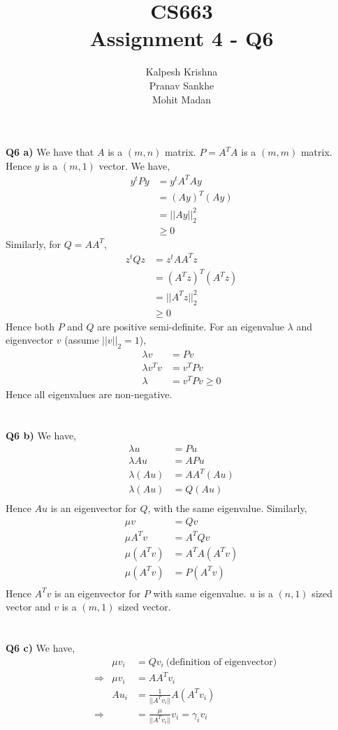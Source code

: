 \documentclass[11pt]{article}
\title{\textbf{CS663 \\ Assignment 4 - Q6}}
\author{Kalpesh Krishna\\ Pranav Sankhe \\ Mohit Madan}
\date{}
\begin{document}
\maketitle
\textbf{Q6 a)} We have that $A$ is a $(m, n)$ matrix. $P = A^T A$ is a $(m, m)$ matrix. Hence $y$ is a $(m, 1)$ vector. We have,
\begin{align*}
y^tPy &= y^t A^T A y\\
&= (Ay)^T (Ay) \\
&= ||Ay||_2^{2} \\
&\geq 0
\end{align*}
Similarly, for $Q = AA^T$,
\begin{align*}
z^tQz &= z^t A A^T z\\
&= (A^Tz)^T (A^Tz) \\
&= ||A^Tz||_2^{2} \\
&\geq 0
\end{align*}
Hence both $P$ and $Q$ are positive semi-definite. For an eigenvalue $\lambda$ and eigenvector $v$ (assume $||v||_2 = 1$),
\begin{align*}
\lambda v &= Pv\\
\lambda v^T v &= v^T P v\\
\lambda &= v^T P v \geq 0
\end{align*}
Hence all eigenvalues are non-negative.\\\\\\
\textbf{Q6 b)} We have,
\begin{align*}
\lambda u &= Pu\\
\lambda Au &= APu \\
\lambda (Au) &= AA^T(Au) \\
\lambda (Au) &= Q(Au) \\
\end{align*}
Hence $Au$ is an eigenvector for $Q$, with the same eigenvalue. Similarly,
\begin{align*}
\mu v &= Qv\\
\mu A^Tv &= A^TQv \\
\mu (A^Tv) &= A^TA(A^Tv) \\
\mu (A^Tv) &= P(A^Tv) \\
\end{align*}
Hence $A^Tv$ is an eigenvector for $P$ with same eigenvalue. $u$ is a $(n, 1)$ sized vector and $v$ is a $(m, 1)$ sized vector.\\\\\\
\textbf{Q6 c)} We have,
\begin{align*}
& &\mu v_i &= Qv_i~\text{(definition of eigenvector)}\\
&\Rightarrow &\mu v_i &= AA^Tv_i\\
& &Au_i &= \frac{1}{||A^Tv_i||}A(A^Tv_i)\\
&\Rightarrow & &= \frac{\mu}{||A^Tv_i||}v_i = \gamma_iv_i\\
\end{align*}
\end{document}
